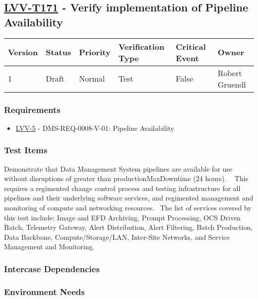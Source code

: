 \subsection{\href{https://jira.lsstcorp.org/secure/Tests.jspa\#/testCase/LVV-T171}{LVV-T171}
    - Verify implementation of Pipeline Availability}\label{lvv-t171}

\begin{longtable}[]{llllll}
\toprule
Version & Status & Priority & Verification Type & Critical Event & Owner
\\\midrule
1 & Draft & Normal &
Test & False & Robert Gruendl
\\\bottomrule
\end{longtable}

\subsubsection{Requirements}
\begin{itemize}
\item \href{https://jira.lsstcorp.org/browse/LVV-5}{LVV-5} - DMS-REQ-0008-V-01: Pipeline Availability
\end{itemize}

\subsubsection{Test Items}
Demonstrate that Data Management System pipelines are available for use
without disruptions of greater than productionMaxDowntime (24 hours). ~
This requires a regimented change control process and testing
infrastructure for all pipelines and their underlying software services,
and regimented management and monitoring of compute and networking
resources. ~The list of services covered by this test include: Image and
EFD Archiving, Prompt Processing, OCS Driven Batch, Telemetry Gateway,
Alert Distribution, Alert Filtering, Batch Production, Data Backbone,
Compute/Storage/LAN, Inter-Site Networks, and Service Management and
Monitoring.



\subsubsection{Intercase Dependencies}

\subsubsection{Environment Needs}

